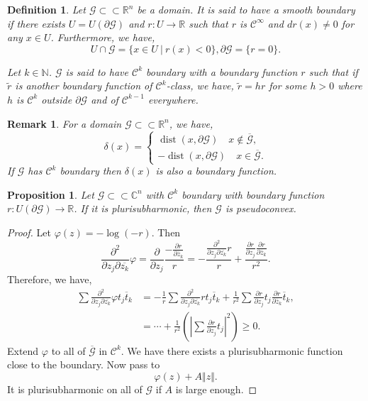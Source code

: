 \documentclass{article}
\newtheorem{proposition}{Proposition}[section]
\newtheorem{definition}{Definition}[section]
\newtheorem{remark}{Remark}[section]
\DeclareMathOperator{\dist}{dist}
\newcommand{\norm}[1]{\Vert #1 \Vert}
\newcommand{\N}[0]{\mathbb{N}}
\newcommand{\R}[0]{\mathbb{R}}
\newcommand{\C}[0]{\mathbb{C}}
\newcommand{\G}[0]{\mathcal{G}}
\newcommand{\sep}[0]{\:|\:}
\newcommand{\pd}[2]{{\frac {\partial#1} {\partial#2}}}
\newcommand{\bd}[0]{\partial}
\newcommand{\compembed}[0]{\subset\subset}
\begin{document}
\begin{definition}
  Let $\G\compembed\R^n$ be a domain. It is said to have a smooth boundary if there exists $U=U(\bd\G)$ and $r:U\to \R$ such that $r$ is $\mathcal{C}^\infty$ and 
  $dr(x)\not=0$ for any $x\in U$. Furthermore, we have,
  \begin{equation*}
    U\cap\G = \{x\in U\sep r(x)<0\},\bd\G=\{r=0\}.
  \end{equation*}
  \par Let $k\in\N$. $\G$ is said to have $\mathcal{C}^k$ boundary with a boundary function $r$ such that if $\tilde{r}$ is another boundary function of $\mathcal{C}^k$-class, we have,
  $\tilde{r} = hr$ for some $h>0$ where $h$ is $\mathcal{C}^k$ outside $\bd\G$ and of $\mathcal{C}^{k-1}$ everywhere.
\end{definition}
\begin{remark}
  For a domain $\G\compembed\R^n$, we have,
  \begin{equation*}
    \delta(x) = 
    \begin{cases}
      \dist(x,\bd\G)\quad x\not\in\overline{\G},\\
      -\dist(x,\bd\G)\quad x\in\overline{\G}.
    \end{cases}
  \end{equation*}
  If $\G$ has $\mathcal{C}^k$ boundary then $\delta(x)$ is also a boundary function.
\end{remark}

\begin{proposition}
  Let $\G\compembed\C^n$ with $\mathcal{C}^k$ boundary with boundary function $r:U(\bd\G)\to\R$. If it is plurisubharmonic, then $\G$ is pseudoconvex.
\end{proposition}

\begin{proof}
  Let $\varphi(z) = -\log(-r)$. Then 
  \begin{equation*}
    {\frac {\partial^2} {\partial z_j\partial \overline{z_{k}}}}\varphi = \pd{}{z_j}{\frac {-\pd{r}{\overline{z}_k}} {r}} = -{\frac { {\frac {\partial^2} {\partial z_j\partial \overline{z_{k}}}} r} {r}}+{\frac {\pd{r}{z_j}\pd{r}{\overline{z}_k}} {r^2}}.
  \end{equation*}
  Therefore, we have,
  \begin{align*}
    \sum{\frac {\partial^2} {\partial z_j\partial \overline{z_{k}}}}\varphi t_j\overline{t}_k &= -{\frac 1 {r}}\sum {\frac {\partial^2} {\partial z_j\partial \overline{z_{k}}}} rt_j\overline{t}_k+{\frac 1 {r^2}}\sum\pd{r}{z_j}t_j\pd{r}{\overline{z}_k}\overline{t}_k,\\
    & = \cdots + {\frac 1 {r^2}}\left(\left|\sum \pd{r}{z_j}t_j\right|^2\right)\geq0.
  \end{align*}
  Extend $\varphi$ to all of $\overline{\G}$ in $\mathcal{C}^k$. We have there exists a plurisubharmonic function close to the boundary. Now pass to 
  \begin{equation*}
    \varphi(z)+A\norm{z}.
  \end{equation*}
  It is plurisubharmonic on all of $\G$ if $A$ is large enough. %
\end{proof}
\end{document}
